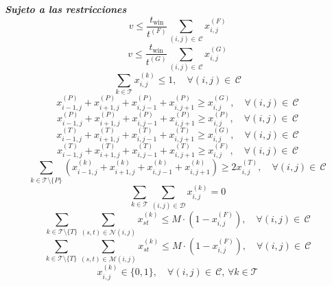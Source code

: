 \documentclass[12pt,a4paper]{book}
\begin{document}
\textbf{\textsl{Sujeto a las restricciones}}
\begin{equation}\label{eq:2_rest_VDP}
v \leq \dfrac{t_{\text{win}}}{t^{(F)}} \sum_{(i,j) \in \, \mathcal{C}} x_{i,j}^{(F)} 
\end{equation}
\begin{equation}\label{eq:3_rest_VDP}
v \leq \dfrac{t_{\text{win}}}{t^{(G)}} \sum_{(i,j) \in \, \mathcal{C}} x_{i,j}^{(G)} 
\end{equation}
\begin{equation}\label{eq:4_rest_VDP}
\sum_{k \in \mathcal{T}} x_{i,j}^{(k)} \leq 1, \quad \forall (i,j) \in \, \mathcal{C}
\end{equation}
\begin{equation}\label{eq:5_rest_VDP}
x_{i-1,j}^{(P)}+x_{i+1,j}^{(P)}+x_{i,j-1}^{(P)}+x_{i,j+1}^{(P)} \geq x_{i,j}^{(G)}, \quad \forall (i,j) \in \, \mathcal{C}
\end{equation}
\begin{equation}\label{eq:6_rest_VDP}
x_{i-1,j}^{(P)}+x_{i+1,j}^{(P)}+x_{i,j-1}^{(P)}+x_{i,j+1}^{(P)} \geq x_{i,j}^{(P)}, \quad \forall (i,j) \in \, \mathcal{C}
\end{equation}
\begin{equation}\label{eq:7_rest_VDP}
x_{i-1,j}^{(T)}+x_{i+1,j}^{(T)}+x_{i,j-1}^{(T)}+x_{i,j+1}^{(T)} \geq x_{i,j}^{(G)}, \quad \forall (i,j) \in \, \mathcal{C}
\end{equation}
\begin{equation}\label{eq:8_rest_VDP}
x_{i-1,j}^{(T)}+x_{i+1,j}^{(T)}+x_{i,j-1}^{(T)}+x_{i,j+1}^{(T)} \geq x_{i,j}^{(F)}, \quad \forall (i,j) \in \, \mathcal{C}
\end{equation}
\begin{equation}\label{eq:9_rest_VDP}
\sum_{k \in \mathcal{T}\setminus \{P\}} (x_{i-1,j}^{(k)}+x_{i+1,j}^{(k)}+x_{i,j-1}^{(k)}+x_{i,j+1}^{(k)}) \geq 2x_{i,j}^{(T)}, \quad \forall (i,j) \in \, \mathcal{C}
\end{equation}
\begin{equation}\label{eq:11_rest_VDP}
\sum_{k \in \mathcal{T}} \sum_{(i,j)\in \mathcal{D}} x_{i,j}^{(k)}=0
\end{equation}
\begin{equation}\label{eq:12_rest_VDP}
\sum_{k \in \mathcal{T}\setminus \{T\}} \sum_{(s,t)\in \mathcal{N}(i,j)} x_{st}^{(k)} \leq M \cdot (1-x_{i,j}^{(F)}), \quad \forall (i,j) \in \, \mathcal{C}
\end{equation}
\begin{equation} \label{eq:13_rest_VDP}
\sum_{k \in \mathcal{T}\setminus \{T\}} \sum_{(s,t)\in \mathcal{M} (i,j)} x_{st}^{(k)} \leq M \cdot (1-x_{i,j}^{(F)}), \quad \forall (i,j) \in \, \mathcal{C}
\end{equation}
\begin{equation} \label{eq:14_rest_VDP}
x_{i,j}^{(k)} \in \{0,1\}, \quad \forall (i,j) \in \, \mathcal{C}, \, \forall k \in \mathcal{T}
\end{equation}
\end{document}
